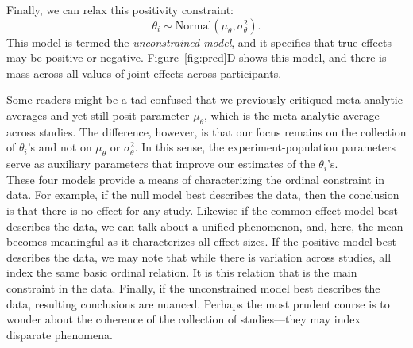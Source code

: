 \documentclass[english,man]{apa6}
\theoremstyle{definition}
\theoremstyle{definition}
\theoremstyle{definition}
\theoremstyle{remark}
\begin{document}
Finally, we can relax this positivity constraint: \[
\theta_i \sim \mbox{Normal}(\mu_\theta,\sigma^2_\theta).
\] This model is termed the \emph{unconstrained model}, and it specifies
that true effects may be positive or negative. Figure~\ref{fig:pred}D
shows this model, and there is mass across all values of joint effects
across participants.

Some readers might be a tad confused that we previously critiqued
meta-analytic averages and yet still posit parameter \(\mu_\theta\),
which is the meta-analytic average across studies. The difference,
however, is that our focus remains on the collection of \(\theta_i\)'s
and not on \(\mu_\theta\) or \(\sigma^2_\theta\). In this sense, the
experiment-population parameters serve as auxiliary parameters that
improve our estimates of the \(\theta_i\)'s.\\
These four models provide a means of characterizing the ordinal
constraint in data. For example, if the null model best describes the
data, then the conclusion is that there is no effect for any study.
Likewise if the common-effect model best describes the data, we can talk
about a unified phenomenon, and, here, the mean becomes meaningful as it
characterizes all effect sizes. If the positive model best describes the
data, we may note that while there is variation across studies, all
index the same basic ordinal relation. It is this relation that is the
main constraint in the data. Finally, if the unconstrained model best
describes the data, resulting conclusions are nuanced. Perhaps the most
prudent course is to wonder about the coherence of the collection of
studies---they may index disparate phenomena.
\end{document}
